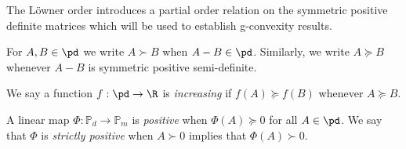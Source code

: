 \documentclass[twoside,11pt]{article}
\begin{document}
The Löwner order introduces a partial order relation on the symmetric positive definite matrices which will be used to establish g-convexity results.
%
\begin{definition}\label{def:loewner_order}
    For $A ,B \in \pd$ we write $A \succ B$ when $A - B \in \pd$. Similarly, we write $A \succeq B$ whenever $A -B$ is symmetric positive semi-definite.
\end{definition}
%
We say a function $f: \pd \rightarrow \R$ is \textit{increasing} if $f(A) \succeq f(B)$ whenever $A \succeq B$.
%


\begin{definition}
    A linear map $\Phi:\mathbb{P}_d \to \mathbb{P}_m$ is \textit{positive} when $\Phi(A) \succeq 0$ for all $A \in \pd$. We say that $\Phi$ is \textit{strictly positive} when $A \succ 0$ implies that $\Phi(A) \succ 0$.
\end{definition}
%
\end{document}
